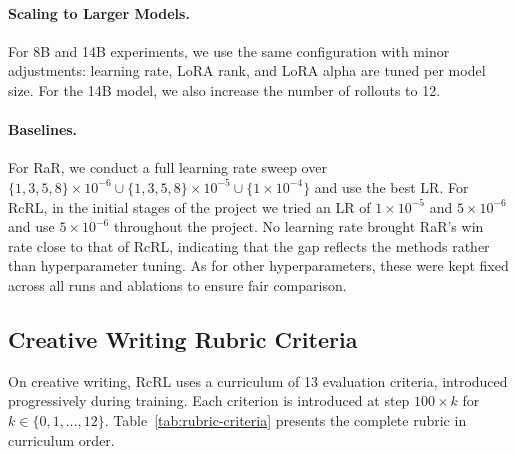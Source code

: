 \documentclass{article}
\theoremstyle{plain}
\theoremstyle{definition}
\theoremstyle{remark}
\begin{document}
\paragraph{Scaling to Larger Models.} For 8B and 14B experiments, we use the same configuration with minor adjustments: learning rate, LoRA rank, and LoRA alpha are tuned per model size. For the 14B model, we also increase the number of rollouts to 12.

\paragraph{Baselines.} For RaR, we conduct a full learning rate sweep over $\{1, 3, 5, 8\} \times 10^{-6} \cup \{1, 3, 5, 8\} \times 10^{-5} \cup \{1 \times 10^{-4}\}$ and use the best LR. For RcRL, in the initial stages of the project we tried an LR of $1 \times 10^{-5}$ and $5 \times 10^{-6}$ and use $5 \times 10^{-6}$ throughout the project. No learning rate brought RaR's win rate close to that of RcRL, indicating that the gap reflects the methods rather than hyperparameter tuning. As for other hyperparameters, these were kept fixed across all runs and ablations to ensure fair comparison.

\subsection{Creative Writing Rubric Criteria}
\label{app:rubric-criteria}

On creative writing, RcRL uses a curriculum of 13 evaluation criteria, introduced progressively during training. Each criterion is introduced at step $100 \times k$ for $k \in \{0, 1, \ldots, 12\}$. Table~\ref{tab:rubric-criteria} presents the complete rubric in curriculum order.
\end{document}
